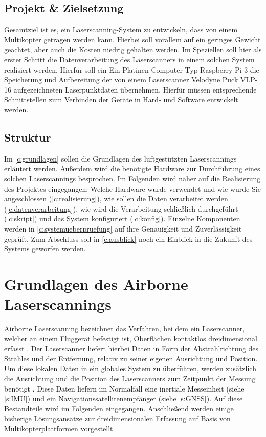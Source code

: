 \documentclass[a4paper,12pt,bibliography=totoc, listof=totoc,titlepage,pointlessnumbers]{scrreprt}
\begin{document}
\section{Projekt \& Zielsetzung}
Gesamtziel ist es, ein Laserscanning-System zu entwickeln, dass von einem Multikopter getragen werden kann. Hierbei soll vorallem auf ein geringes Gewicht geachtet, aber auch die Kosten niedrig gehalten werden. Im Speziellen soll hier als erster Schritt die Datenverarbeitung des Laser\-scan\-ners in einem solchen System realisiert werden. Hierfür soll ein Ein-Platinen-Computer Typ Raspberry Pi 3 die Speicherung und Aufbereitung der von einem Laser\-scan\-ner Velodyne Puck VLP-16 aufgezeichneten Laserpunktdaten übernehmen. Hierfür müssen entsprechende Schnittstellen zum Verbinden der Geräte in Hard- und Software entwickelt werden. \citep{carlos}


\section{Struktur}
Im \autoref{c:grundlagen} sollen die Grundlagen des luftgestützten Laserscannings erläutert werden. Außerdem wird die benötigte Hardware zur Durchführung eines solchen Laserscannings besprochen. Im Folgenden wird näher auf die Realisierung des Projektes eingegangen: Welche Hardware wurde verwendet und wie wurde Sie angeschlossen (\autoref{c:realisierung}), wie sollen die Daten verarbeitet werden (\autoref{c:datenverarbeitung}), wie wird die Verarbeitung schließlich durchgeführt (\autoref{c:skript}) und das System konfiguriert (\autoref{c:konfig}). Einzelne Komponenten werden in \autoref{c:systemueberpruefung} auf ihre Genauigkeit und Zuverlässigkeit geprüft. Zum Abschluss soll in \autoref{c:ausblick} noch ein Einblick in die Zukunft des Systems geworfen werden.

\chapter{Grundlagen des Airborne Laserscannings}
\label{c:grundlagen}

Airborne Laserscanning bezeichnet das Verfahren, bei dem ein Laser\-scan\-ner, welcher an einem Fluggerät befestigt ist, Oberflächen kontaktlos dreidimensional erfasst \citep[S. 1]{beraldin}. Der Laser\-scan\-ner liefert hierbei Daten in Form der Abstrahlrichtung des Strahles und der Entfernung, relativ zu seiner eigenen Ausrichtung und Position. Um diese lokalen Daten in ein globales System zu überführen, werden zusätzlich die Ausrichtung und die Position des Laser\-scan\-ners zum Zeitpunkt der Messung benötigt \citep[S. 22f]{beraldin}. Diese Daten liefern im Normalfall eine inertiale Messeinheit (siehe \autoref{s:IMU}) und ein Navigationssatellitenempfänger (siehe \autoref{s:GNSS}). Auf diese Bestandteile wird im Folgenden eingegangen. Anschließend werden einige bisherige Lösungsansätze zur dreidimensionalen Erfassung auf Basis von Multikopterplattformen vorgestellt.
\end{document}
